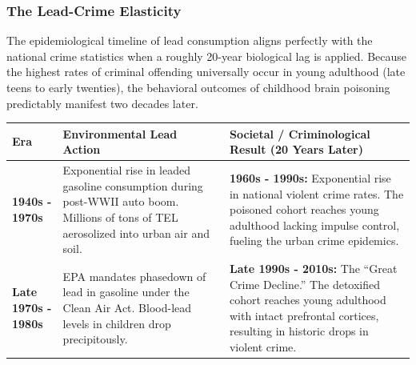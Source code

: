 \documentclass[
]{article}
\newcounter{none} %
\begin{document}
\subsubsection{\texorpdfstring{\textbf{The Lead-Crime
Elasticity}}{The Lead-Crime Elasticity}}\label{the-lead-crime-elasticity}

The epidemiological timeline of lead consumption aligns perfectly with
the national crime statistics when a roughly 20-year biological lag is
applied. Because the highest rates of criminal offending universally
occur in young adulthood (late teens to early twenties), the behavioral
outcomes of childhood brain poisoning predictably manifest two decades
later.

{\def\LTcaptype{none} %
\begin{longtable}[]{@{}
  >{\raggedright\arraybackslash}p{}
  >{\raggedright\arraybackslash}p{}
  >{\raggedright\arraybackslash}p{}@{}}
\toprule\noalign{}
\begin{minipage}[b]{\linewidth}\raggedright
Era
\end{minipage} & \begin{minipage}[b]{\linewidth}\raggedright
Environmental Lead Action
\end{minipage} & \begin{minipage}[b]{\linewidth}\raggedright
Societal / Criminological Result (20 Years Later)
\end{minipage} \\
\midrule\noalign{}
\endhead
\bottomrule\noalign{}
\endlastfoot
\textbf{1940s - 1970s} & Exponential rise in leaded gasoline consumption
during post-WWII auto boom. Millions of tons of TEL aerosolized into
urban air and soil. & \textbf{1960s - 1990s:} Exponential rise in
national violent crime rates. The poisoned cohort reaches young
adulthood lacking impulse control, fueling the urban crime epidemics. \\
\textbf{Late 1970s - 1980s} & EPA mandates phasedown of lead in gasoline
under the Clean Air Act. Blood-lead levels in children drop
precipitously. & \textbf{Late 1990s - 2010s:} The ``Great Crime
Decline.'' The detoxified cohort reaches young adulthood with intact
prefrontal cortices, resulting in historic drops in violent crime. \\
\end{longtable}
}
\end{document}
